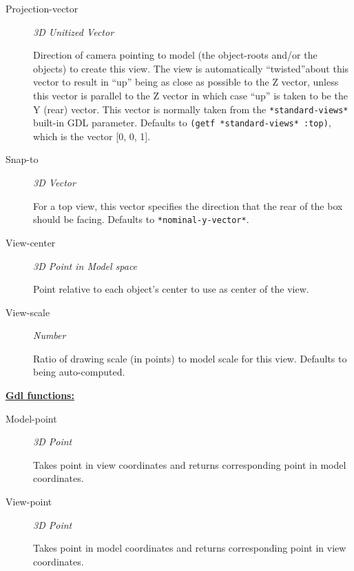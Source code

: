 \documentclass [11pt]{book}
\begin{document}
\begin{itemize}
\begin{description}
\item [Projection-vector]
\emph{3D Unitized Vector}

 Direction of camera pointing to model (the object-roots and/or the objects) to create
this view. The view is automatically ``twisted''about this vector to result in ``up'' being as close as
possible to the Z vector, unless this vector is parallel to the Z vector in which case ``up'' is taken
to be the Y (rear) vector. This vector is normally taken from the \texttt{*standard-views*} built-in GDL
parameter. Defaults to \texttt{(getf *standard-views* :top)}, which is the vector [0, 0, 1].




\item [Snap-to]
\emph{3D Vector}

 For a top view, this vector specifies the direction that the rear of
the box should be facing. Defaults to \texttt{*nominal-y-vector*}.




\item [View-center]
\emph{3D Point in Model space}

 Point relative to each object's center to use as center of the view.




\item [View-scale]
\emph{Number}

 Ratio of drawing scale (in points) to model scale for this view. Defaults to being auto-computed.




\end{description}






\textbf{
\underline{Gdl functions:}}

\begin{description}

\item [Model-point]
\emph{3D Point}

 Takes point in view coordinates and returns corresponding point in model coordinates.




\item [View-point]
\emph{3D Point}

 Takes point in model coordinates and returns corresponding point in view coordinates.





\end{description}
\end{itemize}
\end{document}
